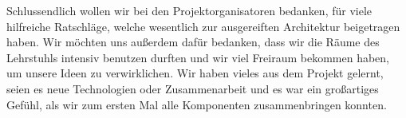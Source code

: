 Schlussendlich wollen wir bei den Projektorganisatoren bedanken, für viele
hilfreiche Ratschläge, welche wesentlich zur ausgereiften Architektur
beigetragen haben. Wir möchten uns außerdem dafür bedanken, dass wir die
Räume des Lehrstuhls intensiv benutzen durften und wir viel Freiraum bekommen
haben, um unsere Ideen zu verwirklichen. Wir haben vieles aus dem Projekt 
gelernt, seien es neue Technologien oder Zusammenarbeit und es war ein
großartiges Gefühl, als wir zum ersten Mal alle Komponenten zusammenbringen
konnten.
